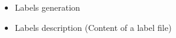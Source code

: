 \begin{itemize}
	\item Labels generation
	\item Labels description (Content of a label file)
\end{itemize}